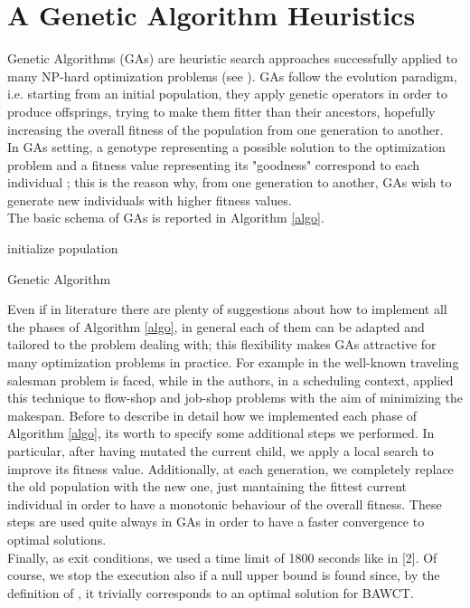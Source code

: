 \documentclass[opre,nonblindrev]{informs3} %
\begin{document}
\section{A Genetic Algorithm Heuristics}
Genetic Algorithms (GAs) are heuristic search approaches successfully applied to many NP-hard optimization problems (see \cite{kramer}). GAs follow the evolution paradigm, i.e. starting from an initial population, they apply genetic operators in order to produce offsprings, trying to make them fitter than their ancestors, hopefully increasing the overall fitness of the population from one generation to another.\\
In GAs setting, a genotype representing a possible solution to the optimization problem and a fitness value representing its "goodness" correspond to each individual ; this is the reason why, from one generation to another, GAs wish to generate new individuals with higher fitness values.\\
The	basic schema of GAs is reported in Algorithm \ref{algo}.\\
\begin{algorithm} \label{algo}
	\SetAlgoLined
	initialize population\\
	\caption{Genetic Algorithm}
\end{algorithm}
\noindent Even if in literature there are plenty of suggestions about how to implement all the phases of Algorithm \ref{algo}, in general each of them can be adapted and tailored to the problem dealing with; this flexibility makes GAs attractive for many optimization problems in practice. For example in \cite{tsp1,tsp2,tsp3} the well-known traveling salesman problem is faced, while in \cite{sched1,sched3} the authors, in a scheduling context, applied this technique to flow-shop and job-shop problems with the aim of minimizing the makespan.
Before to describe in detail how we implemented each phase of Algorithm \ref{algo}, its worth to specify some additional steps we performed. In particular, after having mutated the current child, we apply a local search to improve its fitness value. Additionally, at each generation, we completely replace the old population with the new one, just mantaining the fittest current individual in order to have a monotonic behaviour of the overall fitness. These steps are used quite always in GAs in order to have a faster convergence to optimal solutions.\\
Finally, as exit conditions, we used a time limit of 1800 seconds like in [2]. Of course, we stop the execution also if a null upper bound is found since, by the definition of , it trivially corresponds to an optimal solution for BAWCT.\\ 
\end{document}
